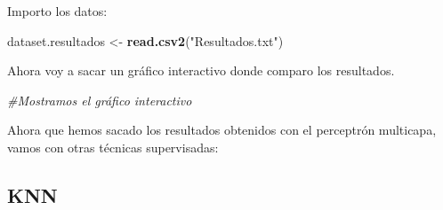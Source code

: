 \documentclass[]{article}
\newenvironment{Shaded}{\begin{snugshade}}{\end{snugshade}}
\newcommand{\KeywordTok}[1]{\textcolor[rgb]{0.13,0.29,0.53}{\textbf{#1}}}
\newcommand{\DataTypeTok}[1]{\textcolor[rgb]{0.13,0.29,0.53}{#1}}
\newcommand{\DecValTok}[1]{\textcolor[rgb]{0.00,0.00,0.81}{#1}}
\newcommand{\StringTok}[1]{\textcolor[rgb]{0.31,0.60,0.02}{#1}}
\newcommand{\CommentTok}[1]{\textcolor[rgb]{0.56,0.35,0.01}{\textit{#1}}}
\newcommand{\OperatorTok}[1]{\textcolor[rgb]{0.81,0.36,0.00}{\textbf{#1}}}
\newcommand{\NormalTok}[1]{#1}
\begin{document}
Importo los datos:

\begin{Shaded}
\begin{Highlighting}[]
\NormalTok{dataset.resultados <-}\StringTok{ }\KeywordTok{read.csv2}\NormalTok{(}\StringTok{"Resultados.txt"}\NormalTok{)}
\end{Highlighting}
\end{Shaded}

Ahora voy a sacar un gráfico interactivo donde comparo los resultados.

\begin{Shaded}
\end{Shaded}

\hypertarget{htmlwidget-ad51aea8efa160d5efb0}{}

\begin{Shaded}
\begin{Highlighting}[]
\CommentTok{#Mostramos el gráfico interactivo}
\end{Highlighting}
\end{Shaded}

Ahora que hemos sacado los resultados obtenidos con el perceptrón
multicapa, vamos con otras técnicas supervisadas:

\subsection{KNN}\label{knn}
\end{document}
